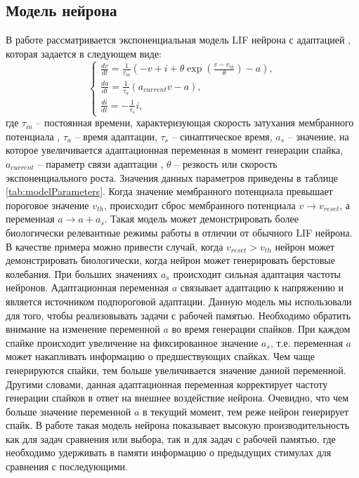 \documentclass{article}
\begin{document}
\subsection{Модель нейрона}
В работе рассматривается экспоненциальная модель LIF нейрона с адаптацией \cite{brette2005adaptive}, которая задается в следующем виде:
\begin{equation} \label{eq:AdexNeuron}
  \begin{cases}
    \frac{dv}{dt} = \frac{1}{\tau_m} (-v + i + \theta \exp{(\frac{v - v_{th}}{\theta})} - a), \\
    \frac{da}{dt} = \frac{1}{\tau_a}(a_{current} v - a),                                      \\
    \frac{di}{dt} = -\frac{1}{\tau_s}i,
  \end{cases}
\end{equation}
где $\tau_m$ -- постоянная времени, характеризующая скорость затухания мембранного потенциала ,
$\tau_a$ -- время адаптации, $\tau_s$ -- синаптическое время, $a_s$ -- значение, на которое увеличивается адаптационная переменная в момент генерации спайка, $a_{current}$ -- параметр связи адаптации , $\theta$ -- резкость или скорость экспоненциального роста. Значения данных параметров приведены
в таблице \ref{tab:modelParameters}. Когда значение мембранного потенциала превышает пороговое значение $v_{th}$, происходит сброс мембранного потенциала $v \rightarrow v_{reset}$, а переменная $a \rightarrow a + a_s$. Такая модель может демонстрировать более биологически релевантные режимы работы в отличии от обычного LIF нейрона. В качестве примера можно привести случай, когда $v_{reset} > v_{th}$ нейрон может демонстрировать биологически, когда нейрон может генерировать берстовые колебания. При больших значениях $a_s$ происходит сильная адаптация частоты нейронов. Адаптационная переменная $a$ связывает адаптацию к напряжению и является источником подпороговой адаптации. Данную модель мы использовали для того, чтобы реализовывать задачи с рабочей памятью. Необходимо обратить внимание на изменение переменной $a$ во время генерации спайков. При каждом спайке происходит увеличение на фиксированное значение $a_s$, т.е. переменная $a$ может накапливать информацию о предшествующих спайках. Чем чаще генерируются спайки, тем больше увеличивается значение данной переменной. Другими словами, данная адаптационная переменная корректирует частоту генерации спайков в ответ на внешнее воздействие нейрона. Очевидно, что чем больше значение переменной $a$ в текущий момент, тем реже нейрон генерирует спайк. В работе такая модель нейрона показывает высокую производительность как для задач сравнения или выбора, так и для задач с рабочей памятью, где необходимо удерживать в памяти информацию о предыдущих стимулах для сравнения с последующими.
\end{document}
